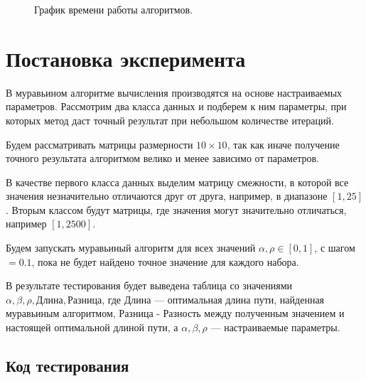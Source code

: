 \begin{figure}[h]
    \centering
    \captionsetup{justification=centering}
    \caption{График времени работы алгоритмов.}
    \label{plt:time}
\end{figure}

\section{Постановка эксперимента}
В муравьином алгоритме вычисления производятся на основе настраиваемых параметров.
Рассмотрим два класса данных и подберем к ним параметры, при которых метод даст точный результат при небольшом количестве итераций.

Будем рассматривать матрицы размерности $10\times10$, так как иначе получение точного результата алгоритмом велико и менее зависимо от параметров.

В качестве первого класса данных выделим матрицу смежности, в которой все значения незначительно отличаются друг от друга, например, в диапазоне $[1, 25]$.
Вторым классом будут матрицы, где значения могут значительно отличаться, например $[1, 2500]$.

Будем запускать муравьиный алгоритм для всех значений $\alpha, \rho\in[0, 1]$, с шагом $= 0.1$, пока не будет найдено точное значение для каждого набора.

В результате тестирования будет выведена таблица со значениями $\alpha, \beta, \rho, Длина, Разница$, где $Длина$ — оптимальная длина пути, найденная муравьиным алгоритмом, $Разница$ - Разность между полученным значением и настоящей оптимальной длиной пути, а $\alpha, \beta, \rho$ — настраиваемые параметры.

\subsection{Код тестирования}

